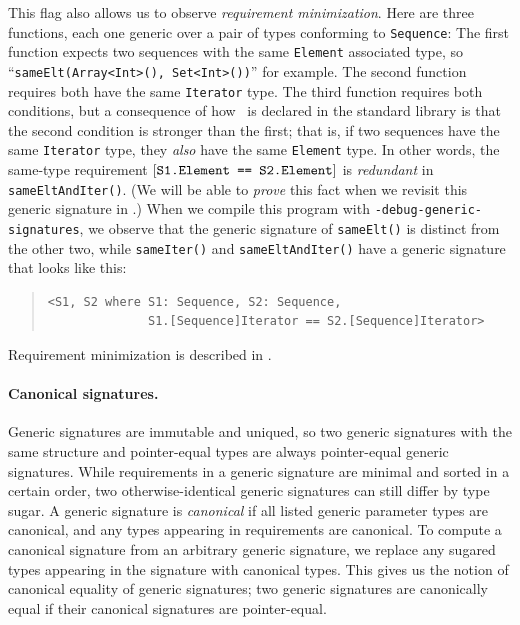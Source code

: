 \documentclass[../generics]{subfiles}
\begin{document}
This flag also allows us to observe \emph{requirement minimization}. Here are three functions, each one generic over a pair of types conforming to \texttt{Sequence}:
The first function expects two sequences with the same \texttt{Element} associated type, so ``\verb|sameElt(Array<Int>(), Set<Int>())|'' for example. The second function requires both have the same \texttt{Iterator} type. The third function requires both conditions, but a consequence of how \tSequence\ is declared in the standard library is that the second condition is stronger than the first; that is, if two sequences have the same \texttt{Iterator} type, they \emph{also} have the same \texttt{Element} type. In other words, the same-type requirement $[\texttt{S1.Element == S2.Element}]$ is \emph{redundant} in \texttt{sameEltAndIter()}. (We will be able to \emph{prove} this fact when we revisit this generic signature in .) When we compile this program with \texttt{-debug-generic-signatures}, we observe that the generic signature of \texttt{sameElt()} is distinct from the other two, while \texttt{sameIter()} and \texttt{sameEltAndIter()} have a generic signature that looks like this:
\begin{quote}
\begin{verbatim}
<S1, S2 where S1: Sequence, S2: Sequence,
              S1.[Sequence]Iterator == S2.[Sequence]Iterator>
\end{verbatim}
\end{quote}
Requirement minimization is described in .

\paragraph{Canonical signatures.}
Generic signatures are immutable and uniqued, so two generic signatures with the same structure and pointer-equal types are always pointer-equal generic signatures. While requirements in a generic signature are minimal and sorted in a certain order, two otherwise-identical generic signatures can still differ by type sugar. A generic signature is \emph{canonical} if all listed generic parameter types are canonical, and any types appearing in requirements are canonical. To compute a canonical signature from an arbitrary generic signature, we replace any sugared types appearing in the signature with canonical types. This gives us the notion of canonical equality of generic signatures; two generic signatures are canonically equal if their canonical signatures are pointer-equal.
\end{document}
